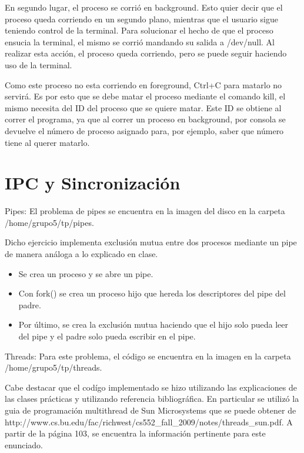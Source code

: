 \documentclass[a4paper, 12pt]{article}
\begin{document}
En segundo lugar, el proceso se corri\'o en background. Esto quier decir que el proceso queda corriendo en un segundo plano, mientras que el usuario sigue teniendo control de la terminal. Para solucionar el hecho de que el proceso ensucia la terminal, el mismo se corri\'o mandando su salida a /dev/null. Al realizar esta acci\'on, el proceso queda corriendo, pero se puede seguir haciendo uso de la terminal. 

Como este proceso no esta corriendo en foreground, Ctrl+C para matarlo no servir\'a. Es por esto que se debe matar el proceso mediante el comando kill, el mismo necesita del ID del proceso que se quiere matar. Este ID se obtiene al correr el programa, ya que al correr un proceso en background, por consola se devuelve el n\'umero de proceso asignado para, por ejemplo, saber que n\'umero tiene al querer matarlo.

\section*{IPC y Sincronizaci\'on}

Pipes: El problema de pipes se encuentra en la imagen del disco en la carpeta /home/grupo5/tp/pipes.

Dicho ejercicio implementa exclusi\'on mutua entre dos procesos mediante un pipe de manera an\'aloga a lo explicado en clase.
\begin{itemize}
\item Se crea un proceso y se abre un pipe.
\item Con fork() se crea un proceso hijo que hereda los descriptores del pipe del padre.
\item Por \'ultimo, se crea la exclusi\'on mutua haciendo que el hijo solo pueda leer del pipe y el padre solo pueda escribir en el pipe.
\end{itemize}

\bigskip

Threads: Para este problema, el c\'odigo se encuentra en la imagen en la carpeta /home/grupo5/tp/threads. 

Cabe destacar que el cod\'igo implementado se hizo utilizando las explicaciones de las clases pr\'acticas y utilizando referencia bibliogr\'afica. En particular se utiliz\'o la guia de programaci\'on multithread de Sun Microsystems que se puede obtener de http://www.cs.bu.edu/fac/richwest/cs552\_fall\_2009/notes/threads\_sun.pdf. A partir de la p\'agina 103, se encuentra la informaci\'on pertinente para este enunciado.
\end{document}
